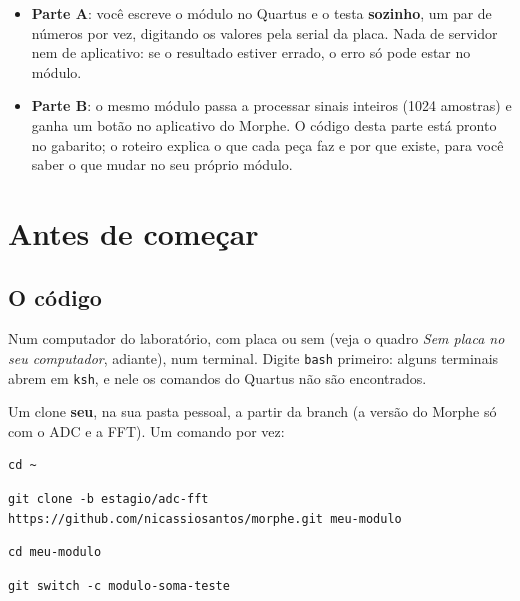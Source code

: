 \documentclass[11pt,a4paper,oneside]{article}
\newcommand{\arq}[1]{{\upshape\ttfamily\detokenize{#1}}}
\begin{document}
\begin{itemize}
  \item \textbf{Parte A}: você escreve o módulo no Quartus e o testa
    \textbf{sozinho}, um par de números por vez, digitando os valores pela
    serial da placa. Nada de servidor nem de aplicativo: se o resultado
    estiver errado, o erro só pode estar no módulo.
  \item \textbf{Parte B}: o mesmo módulo passa a processar sinais inteiros
    (1024 amostras) e ganha um botão no aplicativo do Morphe. O código desta
    parte está pronto no gabarito; o roteiro explica o que cada peça faz e
    por que existe, para você saber o que mudar no seu próprio módulo.
\end{itemize}

\section*{Antes de começar}

\subsection*{O código}

Num computador do laboratório, com placa ou sem (veja o quadro
\emph{Sem placa no seu computador}, adiante), num terminal. Digite
\texttt{bash} primeiro: alguns terminais abrem em \texttt{ksh}, e nele os
comandos do Quartus não são encontrados.

\begin{faca}
Um clone \textbf{seu}, na sua pasta pessoal, a partir da branch
\arq{estagio/adc-fft} (a versão do Morphe só com o ADC e a FFT).
Um comando por vez:
\begin{lstlisting}[style=sh]
cd ~
\end{lstlisting}
\begin{lstlisting}[style=sh]
git clone -b estagio/adc-fft https://github.com/nicassiosantos/morphe.git meu-modulo
\end{lstlisting}
\begin{lstlisting}[style=sh]
cd meu-modulo
\end{lstlisting}
\begin{lstlisting}[style=sh]
git switch -c modulo-soma-teste
\end{lstlisting}
\end{faca}
\end{document}
